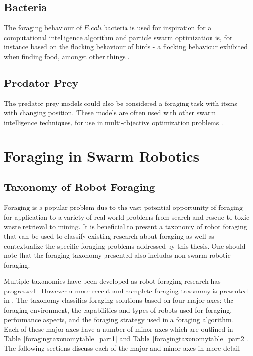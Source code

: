 \subsection{Bacteria}

The foraging behaviour of $E. coli$ bacteria is used for inspiration for a computational intelligence algorithm \cite{passino2010bacterial} and particle swarm optimization is, for instance based on the flocking behaviour of birds - a flocking behaviour exhibited when finding food, amongst other things \cite{kennedy1995particle}. 

\subsection{Predator Prey}

The predator prey models could also be considered a foraging task with items with changing position. These models are often used with other swarm intelligence techniques, for use in multi-objective optimization problems \cite{nolfi1998coevolving}.


\section{Foraging in Swarm Robotics}

\subsection{Taxonomy of Robot Foraging}
\label{sec:second:types}

Foraging is a popular problem due to the vast potential opportunity of foraging for application to a variety of real-world problems from search and rescue \cite{jennings1997cooperative} to toxic waste retrieval to mining. It is beneficial to present a taxonomy of robot foraging that can be used to classify existing research about foraging as well as contextualize the specific foraging problems addressed by this thesis. One should note that the foraging taxonomy presented also includes non-swarm robotic foraging.

Multiple taxonomies have been developed as robot foraging research has progressed \cite{oster1978caste,ostergaard2001emergent}. However a more recent and complete foraging taxonomy is presented in \cite{winfield2009foraging}. The taxonomy classifies foraging solutions based on four major axes: the foraging environment, the capabilities and types of robots used for foraging, performance aspects, and the foraging strategy used in a foraging algorithm. Each of these major axes have a number of minor axes which are outlined in Table~\ref{foragingtaxonomytable_part1} and Table~\ref{foragingtaxonomytable_part2}.  The following sections discuss each of the major and minor axes in more detail

